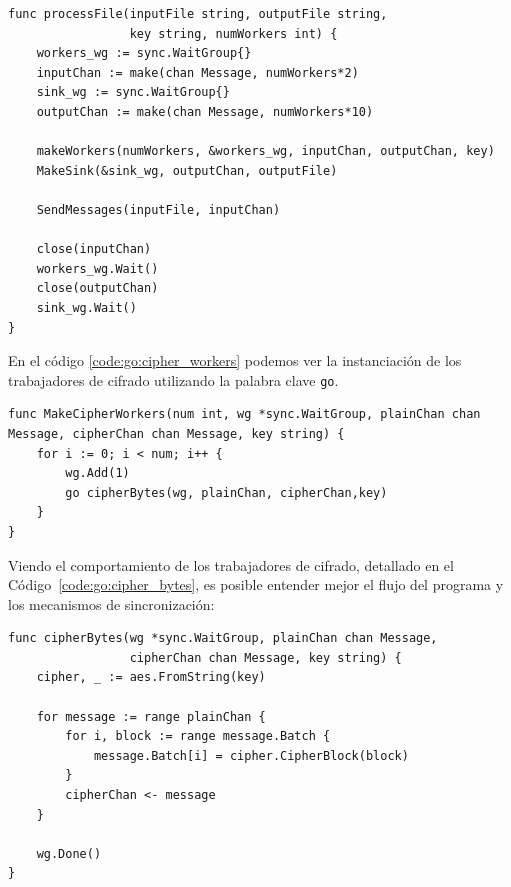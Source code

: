 \documentclass[11pt]{article}
\newcommand{\english}[1]{\textit{#1}}
\begin{document}
\begin{listing}[h]
\begin{verbatim}
func processFile(inputFile string, outputFile string,
                 key string, numWorkers int) {
    workers_wg := sync.WaitGroup{}
    inputChan := make(chan Message, numWorkers*2)
    sink_wg := sync.WaitGroup{}
    outputChan := make(chan Message, numWorkers*10)

    makeWorkers(numWorkers, &workers_wg, inputChan, outputChan, key)
    MakeSink(&sink_wg, outputChan, outputFile)

    SendMessages(inputFile, inputChan)

    close(inputChan)
    workers_wg.Wait()
    close(outputChan)
    sink_wg.Wait()
}
\end{verbatim}
\caption{Definición de la función \lstinline{processFile} en Go, que crea los trabajadores y el sumidero (\english{sink}), y envía los bloques a los trabajadores}
\label{code:go:process_file}
\end{listing}

En el código \ref{code:go:cipher_workers} podemos ver la instanciación de los trabajadores de cifrado utilizando la palabra clave \lstinline{go}.

\begin{listing}[h]
\begin{verbatim}
func MakeCipherWorkers(num int, wg *sync.WaitGroup, plainChan chan Message, cipherChan chan Message, key string) {
	for i := 0; i < num; i++ {
		wg.Add(1)
		go cipherBytes(wg, plainChan, cipherChan,key)
	}
}
\end{verbatim}
\caption{Definición de la función \lstinline{cipherBytes} en Go, que cifra un conjunto de bloques recibidos a través de un \lstinline{channel}}
\label{code:go:cipher_workers}
\end{listing}

Viendo el comportamiento de los trabajadores de cifrado, detallado en el Código~\ref{code:go:cipher_bytes}, es posible entender mejor el flujo del programa y los mecanismos de sincronización:

\begin{listing}[h]
\begin{verbatim}
func cipherBytes(wg *sync.WaitGroup, plainChan chan Message,
                 cipherChan chan Message, key string) {	
    cipher, _ := aes.FromString(key)

    for message := range plainChan {
        for i, block := range message.Batch {
            message.Batch[i] = cipher.CipherBlock(block)
        }
        cipherChan <- message
    }

    wg.Done()
}
\end{verbatim}
\caption{Definición de la función \lstinline{cipherBytes} en Go, que cifra un conjunto de bloques recibidos a través de un \lstinline{channel}}
\label{code:go:cipher_bytes}
\end{listing}
\end{document}
